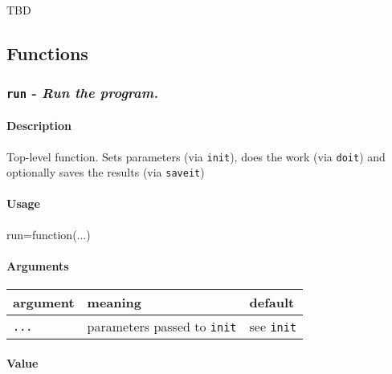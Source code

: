 \documentclass[]{article}
\newenvironment{Shaded}{\begin{snugshade}}{\end{snugshade}}
\newcommand{\NormalTok}[1]{{#1}}
\let\oldparagraph\paragraph
\renewcommand{\paragraph}[1]{\oldparagraph{#1}\mbox{}}
\begin{document}
TBD

\subsection{Functions}\label{functions}

\subsubsection{\texorpdfstring{\texttt{run} - \emph{Run the
program.}}{run - Run the program.}}\label{run---run-the-program.}

\paragraph{Description}\label{description}

Top-level function. Sets parameters (via \texttt{init}), does the work
(via \texttt{doit}) and optionally saves the results (via
\texttt{saveit})

\paragraph{Usage}\label{usage}

\begin{Shaded}
\begin{Highlighting}[]
\NormalTok{run=function(...)}
\end{Highlighting}
\end{Shaded}

\paragraph{Arguments}\label{arguments}

\begingroup
\setlength{\tabcolsep}{10pt} \renewcommand{\arraystretch}{1.2}
\centering

\begin{tabular}{m{}m{}m{}}
\toprule
argument & meaning & default\\
\midrule
\texttt{...} & parameters passed to \texttt{init} & see \texttt{init} \\
\bottomrule
\end{tabular}

\endgroup

\paragraph{Value}\label{value}
\end{document}
